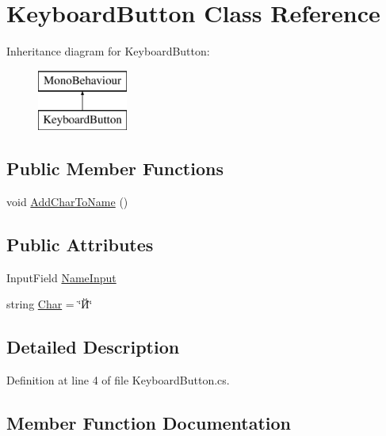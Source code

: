 \hypertarget{class_keyboard_button}{}\section{Keyboard\+Button Class Reference}
\label{class_keyboard_button}
Inheritance diagram for Keyboard\+Button\+:\begin{figure}[H]
\begin{center}
\leavevmode
\includegraphics[height=2.000000cm]{class_keyboard_button}
\end{center}
\end{figure}
\subsection*{Public Member Functions}
\begin{DoxyCompactItemize}
\item 
void \mbox{\hyperlink{class_keyboard_button_a0fe9eff54a77603f03360f9e87f56027}{Add\+Char\+To\+Name}} ()
\end{DoxyCompactItemize}
\subsection*{Public Attributes}
\begin{DoxyCompactItemize}
\item 
Input\+Field \mbox{\hyperlink{class_keyboard_button_a8d576d016d62d49fa39230fdd77c121b}{Name\+Input}}
\item 
string \mbox{\hyperlink{class_keyboard_button_abca77d5a33fd544ec832c16d3970a7ff}{Char}} = \char`\"{}Й\char`\"{}
\end{DoxyCompactItemize}


\subsection{Detailed Description}


Definition at line 4 of file Keyboard\+Button.\+cs.



\subsection{Member Function Documentation}
\mbox{\label{class_keyboard_button_a0fe9eff54a77603f03360f9e87f56027}} 
